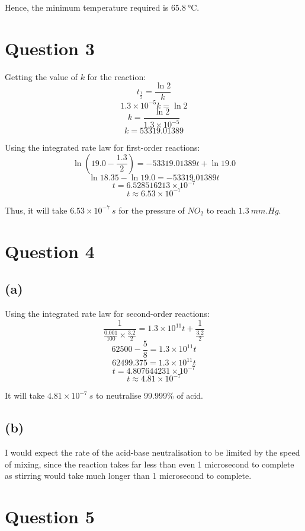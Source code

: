 \documentclass[11pt]{article}
\begin{document}
Hence, the minimum temperature required is \(\qty{65.8}{\unit{\degreeCelsius}}\).


\section{Question 3}
\label{sec:orgf6e35a4}

Getting the value of \(k\) for the reaction:
\[t_{\frac{1}{2}} = \frac{\ln 2}{k}\]
\[1.3 \times 10^{-5} k = \ln 2\]
\[k = \frac{\ln 2}{1.3 \times 10^{-5}}\]
\[k = 53319.01389\]

Using the integrated rate law for first-order reactions:
\[\ln (19.0 - \frac{1.3}{2}) = -53319.01389t + \ln 19.0\]
\[\ln 18.35 - \ln 19.0 = -53319.01389t\]
\[t = 6.528516213 \times 10^{-7}\]
\[t \approx 6.53 \times 10^{-7}\]

Thus, it will take \(6.53 \times 10^{-7} \ \unit{s}\) for the pressure of \(NO_2\) to reach \(\qty{1.3}{\unit{mm.Hg}}\).


\section{Question 4}
\label{sec:org1c9275b}

\subsection{(a)}
\label{sec:org2efcb75}

Using the integrated rate law for second-order reactions:
\[\frac{1}{\frac{0.001}{100} \times \frac{3.2}{2}} = 1.3 \times 10^{11} t + \frac{1}{\frac{3.2}{2}} \]
\[62500 - \frac{5}{8} = 1.3 \times 10^{11}t\]
\[62499.375 = 1.3 \times 10^{11}t\]
\[t = 4.807644231 \times 10^{-7}\]
\[t \approx 4.81 \times 10^{-7}\]

It will take \(4.81 \times 10^{-7} \ \unit{s}\) to neutralise 99.999\% of acid.

\subsection{(b)}
\label{sec:org9f532a1}
I would expect the rate of the acid-base neutralisation to be limited by the speed of mixing, since the reaction takes far less than even 1 microsecond to complete as stirring would take much longer than 1 microsecond to complete.

\newpage

\section{Question 5}
\label{sec:org4c32694}
\end{document}
